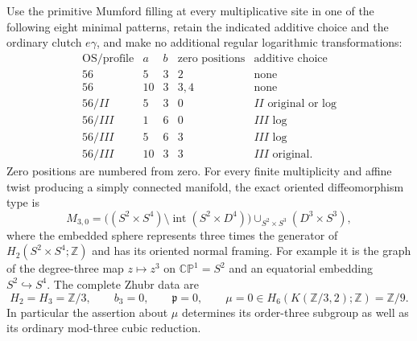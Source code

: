 \begin{theorem}[the full nine-valued invariant in the $c=3$ sector]
Use the primitive Mumford filling at every multiplicative site in one
of the following eight minimal patterns, retain the indicated additive
choice and the ordinary clutch $e\gamma$, and make no additional
regular logarithmic transformations:
\[
\begin{array}{c|r|r|l|l}
\text{OS/profile}&a&b&\text{zero positions}&\text{additive choice}\\\hline
56&5&3&2&\text{none}\\
56&10&3&3,4&\text{none}\\
56/II&5&3&0&II\text{ original or log}\\
56/III&1&6&0&III\text{ log}\\
56/III&5&6&3&III\text{ log}\\
56/III&10&3&3&III\text{ original}.
\end{array}                                                   \tag{D.T31}\label{maps:eq:D.T31}
\]
Zero positions are numbered from zero. For every finite multiplicity
and affine twist producing a simply connected manifold, the exact
oriented diffeomorphism type is
\[
 M_{3,0}=\bigl((S^2\times S^4)\setminus
          \operatorname{int}(S^2\times D^4)\bigr)
               \mathop{\cup}_{S^2\times S^3}(D^3\times S^3),     \tag{D.T32}\label{maps:eq:D.T32}
\]
where the embedded sphere represents three times the generator of
$H_2(S^2\times S^4;\mathbb Z)$ and has its oriented normal framing.
For example it is the graph of the degree-three map
$z\mapsto z^3$ on $\mathbb {CP}^1=S^2$ and an equatorial embedding
$S^2\hookrightarrow S^4$.
The complete Zhubr data are
\[
 H_2=H_3=\mathbb Z/3,\qquad b_3=0,\qquad
 \mathfrak p=0,\qquad
 \mu=0\in H_6(K(\mathbb Z/3,2);\mathbb Z)=\mathbb Z/9.          \tag{D.T33}\label{maps:eq:D.T33}
\]
In particular the assertion about $\mu$ determines its order-three
subgroup as well as its ordinary mod-three cubic reduction.

\end{theorem}


